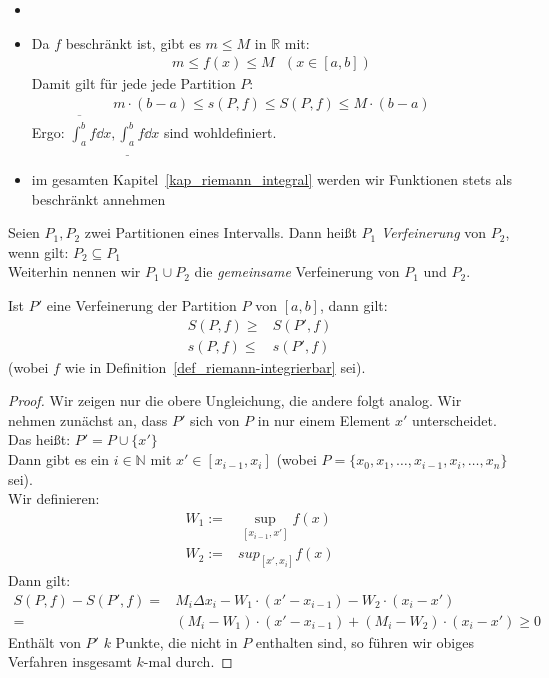 \begin{Bemerkung}{
	\begin{itemize}
		\item[ ]
		\item Da $f$ beschränkt ist, gibt es $m \leq M$ in $\mathbb{R}$ mit:
		\begin{align*}
			m \leq f(x) \leq M \text{ }(x \in [a,b])
		\end{align*}
		Damit gilt für jede jede Partition $P$: 
		\begin{align*}
			m \cdot (b-a) \leq s(P,f) \leq S(P,f) \leq M \cdot (b-a)
		\end{align*}
		Ergo: $\overline{\int_a^b} f \dd{x} , \underline{\int_a^b} f \dd{x}$ 
		sind wohldefiniert.
		\item im gesamten Kapitel~\ref{kap_riemann_integral}
		werden wir Funktionen stets als 
		beschränkt annehmen
	\end{itemize}
}\end{Bemerkung}

\begin{Definition}{
	Seien $P_1, P_2$ zwei Partitionen eines Intervalls. Dann heißt $P_1$ 
	\emph{Verfeinerung} von $P_2$, wenn gilt: $P_2 \subseteq P_1$ \\
	Weiterhin nennen wir $P_1 \cup P_2$ die \emph{gemeinsame} Verfeinerung 
	von $P_1$ und $P_2$.
}\end{Definition}

\begin{Satz}{\label{kap09_satz16}
	Ist $P'$ eine Verfeinerung der Partition $P$ von $[a,b]$, dann gilt:
	\begin{align*}
		S (P,f) \geq & S (P',f) \\
		s(P,f) \leq & s(P',f)
	\end{align*}
	(wobei $f$ wie in Definition~\ref{def_riemann-integrierbar}
	sei).
}\end{Satz}

\begin{proof}
	Wir zeigen nur die obere Ungleichung, die andere folgt analog. 
	Wir nehmen zunächst an, dass $P'$ sich von $P$ in nur einem Element $x'$ 
	unterscheidet. Das heißt: $P' = P \cup \{x'\}$ \\
	Dann gibt es ein $i \in \mathbb{N}$ mit $x' \in [x_{i-1}, x_i]$ \newline
	(wobei $P = \{x_0, x_1, \hdots, x_{i-1}, x_i, \hdots, x_n \}$ sei).\\
	Wir definieren:
	\begin{align*}
		W_1 := & \sup_{[x_{i-1}, x']} f(x) \\
		W_2 := & sup_{[x', x_i]} f(x)
	\end{align*}
	Dann gilt: 
	\begin{align*}
		S(P,f) - S(P',f) = &M_i \Delta x_i - W_1\cdot (x' - x_{i-1}) - 
		W_2\cdot (x_i - x') \\
		= & (M_i -W_1) \cdot (x' - x_{i-1}) 
		+ (M_i - W_2)\cdot(x_i - x') \geq 0
	\end{align*}
	 Enthält von $P'$ $k$ Punkte, die nicht in $P$ enthalten sind, so führen wir 
	 obiges Verfahren insgesamt $k$-mal durch. 
\end{proof}

